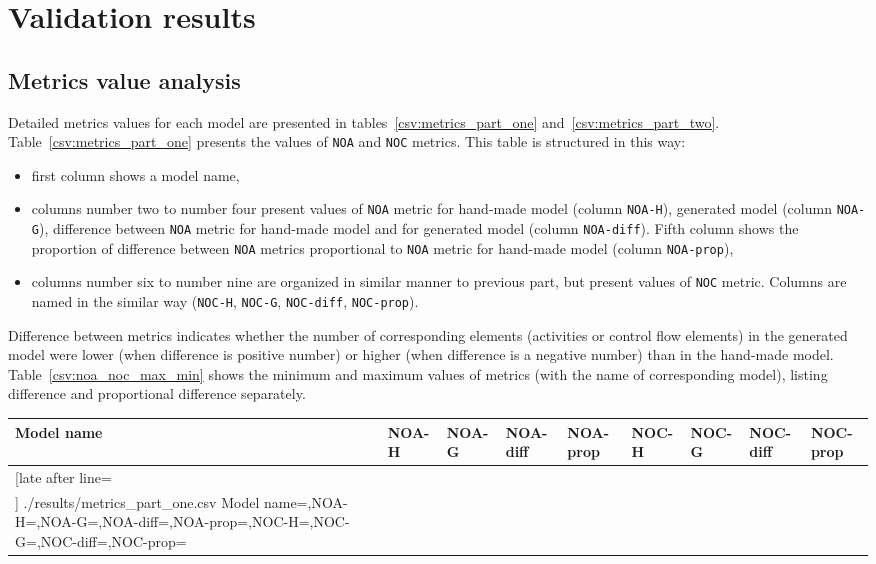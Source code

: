 \section{Validation results}

\subsection{Metrics value analysis}
Detailed metrics values for each model are presented in tables~\ref{csv:metrics_part_one} and~\ref{csv:metrics_part_two}. Table~\ref{csv:metrics_part_one} presents the values of \texttt{NOA} and \texttt{NOC} metrics. This table is structured in this way:
\begin{itemize}
	\item first column shows a model name,
	\item columns number two to number four present values of \texttt{NOA} metric for hand-made model (column \texttt{NOA-H}), generated model (column \texttt{NOA-G}), difference between \texttt{NOA} metric for hand-made model and for generated model (column \texttt{NOA-diff}). Fifth column shows the proportion of difference between \texttt{NOA} metrics proportional to \texttt{NOA} metric for hand-made model (column \texttt{NOA-prop}),
	\item columns number six to number nine are organized in similar manner to previous part, but present values of \texttt{NOC} metric. Columns are named in the similar way (\texttt{NOC-H}, \texttt{NOC-G}, \texttt{NOC-diff}, \texttt{NOC-prop}).
\end{itemize}
Difference between metrics indicates whether the number of corresponding elements (activities or control flow elements) in the generated model were lower (when difference is positive number) or higher (when difference is a negative number) than in the hand-made model. Table~\ref{csv:noa_noc_max_min} shows the minimum and maximum values of metrics (with the name of corresponding model), listing difference and  proportional difference separately.
\newpage
{\scriptsize
	\begin{longtable}{|p{0.09 \hsize}|p{0.08 \hsize}|p{0.08 \hsize}|p{0.08 \hsize}|p{0.08 \hsize}|p{0.08 \hsize}|p{0.08 \hsize}|p{0.08 \hsize}|p{0.09 \hsize}|}
		\hline
		Model name & NOA-H & NOA-G & NOA-diff & NOA-prop & NOC-H & NOC-G & NOC-diff & NOC-prop
		\\\hline\hline
		\csvreader[late after line=\\\hline]
		{./results/metrics_part_one.csv}
		{Model name=\CA,NOA-H=\CB,NOA-G=\CC,NOA-diff=\CD,NOA-prop=\CE,NOC-H=\CF,NOC-G=\CG,NOC-diff=\CH,NOC-prop=\CI}
		{\CA & \CB & \CC & \CD & \CE & \CF & \CG & \CH & \CI}
		\caption{Validation results -- NOA and NOC metrics}
		\label{csv:metrics_part_one}
	\end{longtable}
}
